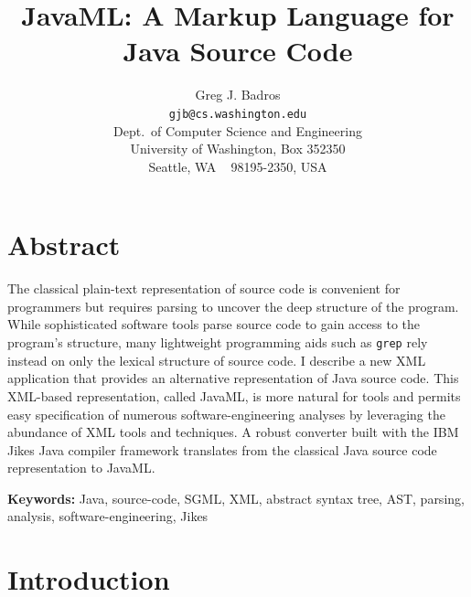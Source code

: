 \documentclass{article}
\begin{document}

\newcommand{\smtexttt}[1]{{\small\texttt{#1}}}
\newenvironment{smverbatim}{\small \begin{verbatim}}{\end{verbatim}}
\newenvironment{shellcommand}{\begin{verbatim}}{\end{verbatim}}
\newenvironment{shelloutput}{\begin{verbatim}}{\end{verbatim}}

\title{JavaML: A Markup Language for Java Source Code}
\author{Greg J. Badros \\
\smtexttt{gjb@cs.washington.edu}\\
Dept.\ of Computer Science and Engineering\\
University of Washington, Box 352350\\
Seattle, WA ~ 98195-2350, USA}
\date{}


\maketitle
\thispagestyle{empty}

\section*{Abstract}
The classical plain-text representation of source code is convenient for
programmers but requires parsing to uncover the deep structure of the
program.  While sophisticated software tools parse source code to gain
access to the program's structure, many lightweight programming aids
such as \smtexttt{grep} rely instead on only the lexical structure of
source code.  I describe a new XML application that provides an
alternative representation of Java source code. This XML-based
representation, called JavaML, is more natural for tools and permits
easy specification of numerous software-engineering analyses by
leveraging the abundance of XML tools and techniques.  A robust
converter built with the IBM Jikes Java compiler framework translates
from the classical Java source code representation to JavaML.

\vspace*{.3cm} \noindent \textbf{Keywords:}
Java, source-code, SGML, XML, abstract syntax tree, AST, parsing,
analysis, software-engineering, Jikes

\section{Introduction}
\label{sec-intro}
\end{document}
